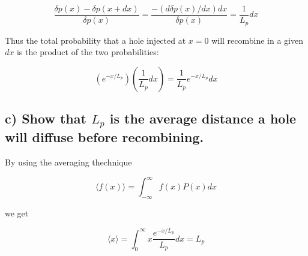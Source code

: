 \begin{equation*}
    \frac{\delta p(x)-\delta p(x+d x)}{\delta p(x)}=\frac{-(d \delta p(x) / d x) d x}{\delta p(x)}=\frac{1}{L_{p}} d x
\end{equation*}

Thus the total probability that a hole injected at $x = 0$ will recombine in a given $dx$ is the product of the two probabilities:

\begin{equation*}
    \left(e^{-x / L_{p}}\right)\left(\frac{1}{L_{p}} d x\right)=\frac{1}{L_{p}} e^{-x / L_{p}} d x
\end{equation*}

\subsection*{c) Show that $L_p$ is the average distance a hole will diffuse before recombining.}

By using the averaging thechnique

\begin{equation*}
    \langle f(x)\rangle=\int_{-\infty}^{\infty} f(x) P(x) d x
\end{equation*}

we get

\begin{equation*}
    \langle x\rangle=\int_{0}^{\infty} x \frac{e^{-x / L_{p}}}{L_{p}} d x=L_{p}
\end{equation*}

